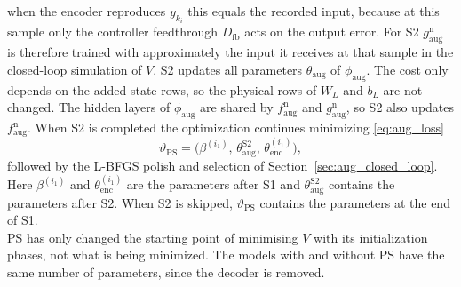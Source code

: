 when the encoder reproduces $y_{k_i}$ this equals the recorded input, 
because at this sample only the controller feedthrough $D_{\mathrm{fb}}$
acts on the output error.
For S2 $g^{\mathrm n}_{\mathrm{aug}}$ is therefore trained with approximately
the input it receives at that sample in the closed-loop simulation of $V$.
S2 updates all parameters $\theta_{\mathrm{aug}}$ of $\phi_{\mathrm{aug}}$.
The cost only depends on the added-state rows, so the physical rows of $W_L$ and $b_L$
are not changed.
The hidden layers of $\phi_{\mathrm{aug}}$ are shared by
$f^{\mathrm n}_{\mathrm{aug}}$ and $g^{\mathrm n}_{\mathrm{aug}}$, so S2 also
updates $f^{\mathrm n}_{\mathrm{aug}}$.
When S2 is completed the optimization continues minimizing
\eqref{eq:aug_loss}
\begin{equation}
 \vartheta_{\mathrm{PS}}
 =\bigl(\beta^{(i_1)},\,\theta^{\mathrm{S2}}_{\mathrm{aug}},\,\theta^{(i_1)}_{\mathrm{enc}}\bigr),
 \label{eq:ps2_handover}
\end{equation}
followed by the L-BFGS polish and selection of Section~\ref{sec:aug_closed_loop}.
Here $\beta^{(i_1)}$ and $\theta^{(i_1)}_{\mathrm{enc}}$ are the parameters
after S1 and $\theta^{\mathrm{S2}}_{\mathrm{aug}}$ contains the parameters
after S2. When S2 is skipped, $\vartheta_{\mathrm{PS}}$ contains the
parameters at the end of S1.
\\
PS has only changed the starting point of minimising $V$ 
with its initialization phases, not what is being minimized.
The models with and without PS have the same number of parameters, 
since the decoder is removed.
